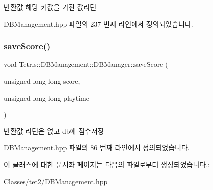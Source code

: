\begin{DoxyReturn}{반환값}
해당 키값을 가진 값리턴 
\end{DoxyReturn}


D\+B\+Management.\+hpp 파일의 237 번째 라인에서 정의되었습니다.

\mbox{\label{class_tetris_1_1_d_b_management_1_1_d_b_manager_aef16da1d2e564caa309bfc3b3e419d7e}} 
\subsubsection{\texorpdfstring{save\+Score()}{saveScore()}}
{\footnotesize\ttfamily void Tetris\+::\+D\+B\+Management\+::\+D\+B\+Manager\+::save\+Score (\begin{DoxyParamCaption}\item[{unsigned long long}]{score,  }\item[{unsigned long long}]{playtime }\end{DoxyParamCaption})\hspace{0.3cm}{\ttfamily [inline]}}

\begin{DoxyReturn}{반환값}
리턴은 없고 db에 점수저장 
\end{DoxyReturn}


D\+B\+Management.\+hpp 파일의 86 번째 라인에서 정의되었습니다.



이 클래스에 대한 문서화 페이지는 다음의 파일로부터 생성되었습니다.\+:\begin{DoxyCompactItemize}
\item 
Classes/tet2/\hyperlink{_d_b_management_8hpp}{D\+B\+Management.\+hpp}\end{DoxyCompactItemize}
